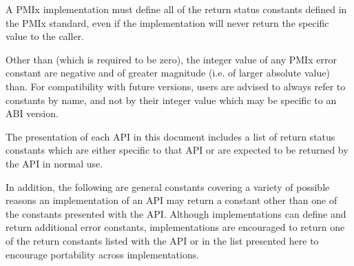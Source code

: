 \adviceimplstart
A \ac{PMIx} implementation must define all of the return status constants defined in the \ac{PMIx} standard, even if the implementation will never return the specific value to the caller.
\adviceimplend

\adviceuserstart
Other than  (which is required to be zero), the integer value of any \ac{PMIx} error constant are negative and of greater magnitude (i.e. of larger absolute value) than.
For compatibility with future versions, users are advised to always refer to constants by name, and not by their integer value which may be specific to an \ac{ABI} version.
\adviceuserend

The presentation of each \ac{API} in this document includes a list of return status constants which are either specific to that \ac{API} or are expected to be returned by the \ac{API} in normal use.

In addition, the following are general constants covering a variety of possible reasons an implementation of an \ac{API} may return a constant other than one of the constants presented with the \ac{API}.  Although implementations can define and return additional error constants, implementations are encouraged to return one of the return constants listed with the \ac{API} or in the list presented here to encourage portability across implementations.

